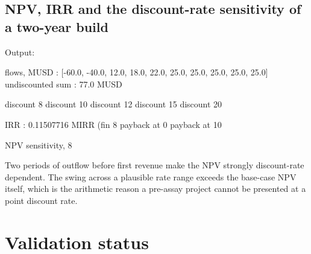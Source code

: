 \documentclass[10pt,a4paper,twoside]{report}
\begin{document}
\subsection*{NPV, IRR and the discount-rate sensitivity of a two-year build}


{\footnotesize\color{slate}Output:\par}

\begin{outputblock}
flows, MUSD             : [-60.0, -40.0, 12.0, 18.0, 22.0, 25.0, 25.0, 25.0, 25.0, 25.0]
undiscounted sum        : 77.0 MUSD

discount 8%
discount 10%
discount 12%
discount 15%
discount 20%

IRR                     : 0.11507716
MIRR (fin 8%
payback at 0%
payback at 10%

NPV sensitivity, 8%
\end{outputblock}

Two periods of outflow before first revenue make the NPV strongly discount-rate dependent. The swing across a plausible rate range exceeds the base-case NPV itself, which is the arithmetic reason a pre-assay project cannot be presented at a point discount rate.

\section{Validation status}
\end{document}
